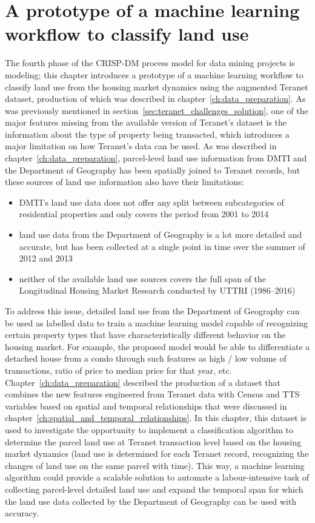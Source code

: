 \chapter{A prototype of a machine learning workflow to classify land use} \label{ch:ml_workflow}

The fourth phase of the CRISP-DM process model for data mining projects is modeling;
this chapter introduces a prototype of a machine learning workflow to classify land use from the housing market dynamics using the augmented Teranet dataset, production of which was described in chapter~\ref{ch:data_preparation}.
As was previously mentioned in section~\ref{sec:teranet_challenges_solution}, one of the major features missing from the available version of Teranet's dataset is the information about the type of property being transacted, which introduces a major limitation on how Teranet's data can be used.
As was described in chapter~\ref{ch:data_preparation}, parcel-level land use information from DMTI and the Department of Geography has been spatially joined to Teranet records, but these sources of land use information also have their limitations:

\begin{itemize}
    \item DMTI's land use data does not offer any split between subcategories of residential properties and only covers the period from 2001 to 2014
    \item land use data from the Department of Geography is a lot more detailed and accurate, but has been collected at a single point in time over the summer of 2012 and 2013
    \item neither of the available land use sources covers the full span of the Longitudinal Housing Market Research conducted by UTTRI (1986--2016)
\end{itemize}

To address this issue, detailed land use from the Department of Geography can be used as labelled data to train a machine learning model capable of recognizing certain property types that have characteristically different behavior on the housing market.
For example, the proposed model would be able to differentiate a detached house from a condo through such features as high / low volume of transactions, ratio of price to median price for that year, etc.
Chapter~\ref{ch:data_preparation} described the production of a dataset that combines the new features engineered from Teranet data with Census and TTS variables based on spatial and temporal relationships that were discussed in chapter~\ref{ch:spatial_and_temporal_relationships}.
In this chapter, this dataset is used to investigate the opportunity to implement a classification algorithm to determine the parcel land use at Teranet transaction level based on the housing market dynamics (land use is determined for each Teranet record, recognizing the changes of land use on the same parcel with time).
This way, a machine learning algorithm could provide a scalable solution to automate a labour-intensive task of collecting parcel-level detailed land use and expand the temporal span for which the land use data collected by the Department of Geography can be used with accuracy.

